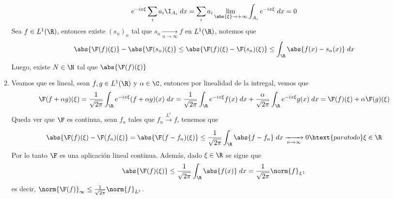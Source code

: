 \documentclass{article}
\begin{document}
\begin{enumerate}
\begin{equation*}
        e^{-ix\xi}\sum_{i}a_{i}\I_{A_{i}}\hspace{1mm}dx=\sum_{i}a_{i}
        \lim\limits_{\abs{\xi}\to+\infty}\int_{A_{i}}e^{-ix\xi}\hspace{1mm}dx=0
    \end{equation*}
    Sea $f\in L^{1}(\R)$, entonces existe $(s_{n})_{n}$ tal que $s_{n}\xrightarrow[n\to\infty]{}f$
    en $L^{1}(\R)$, notemos que
    \begin{equation*}
        \abs{\F(f)(\xi)}-\abs{\F(s_{n})(\xi)}\leq\abs{\F(f)(\xi)-\F(s_{n})(\xi)}
        \leq\int_{\R}\abs{f(x)-s_{n}(x)}\hspace{1mm}dx
    \end{equation*}
    Luego, existe $N\in\N$ tal que $\abs{\F(f)(\xi)}$
    
    \item Veamos que es lineal, sean $f,g\in L^{1}(\R)$ y $\alpha\in\C$, entonces por linealidad
    de la intregal, vemos que
    \begin{equation*}
        \F(f+\alpha g)(\xi)=\frac{1}{\sqrt{2\pi}}\int_{\R}e^{-ix\xi}(f+\alpha g)(x)\hspace{1mm}dx
        =\frac{1}{\sqrt{2\pi}}\int_{\R}e^{-ix\xi}f(x)\hspace{1mm}dx
        +\frac{\alpha}{\sqrt{2\pi}}\int_{\R}e^{-ix\xi}g(x)\hspace{1mm}dx
        =\F(f)(\xi)+\alpha\F(g)(\xi)
    \end{equation*}
    Queda ver que $\F$ es continua, sean $f_{n}$ tales que $f_{n}\xrightarrow[]{L^{1}}f$, tenemos 
    que
    \begin{equation*}
        \abs{\F(f)(\xi)-\F(f_{n})(\xi)}=\abs{\F(f-f_{n})(\xi)}
        \leq\frac{1}{\sqrt{2\pi}}\int_{\R}\abs{f-f_{n}}\hspace{1mm}dx\xrightarrow[n\to\infty]{}0
        \htext{para todo }\xi\in\R
    \end{equation*}
    Por lo tanto $\F$ es una aplicación lineal continua. Además, dado $\xi\in\R$ se sigue que
    \begin{equation*}
        \abs{\F(f)(\xi)}\leq\frac{1}{\sqrt{2\pi}}\int_{\R}\abs{f(x)}\hspace{1mm}dx
        =\frac{1}{\sqrt{2\pi}}\norm{f}_{L^{1}}
    \end{equation*}
    es decir, $\norm{\F(f)}_{\infty}\leq\frac{1}{\sqrt{2\pi}}\norm{f}_{L^{1}}$.
    

\end{enumerate}
\end{document}
